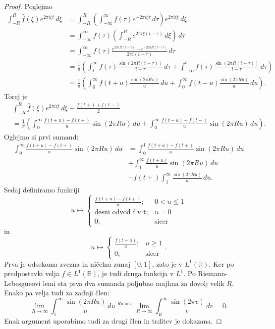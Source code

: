 \documentclass[10pt, a4paper]{article}
\newenvironment{noticeC}{%
  \tcolorbox[%
  notitle,
  empty,
  enhanced,  %
  breakable,
  coltext=black, 
  fontupper=\rmfamily,
  parbox=false,
  noparskip,
  sharp corners,
  boxrule=-1pt,  %
  frame hidden,
  left=7pt,  %
  right=7pt,
  top=5pt,
  bottom=5pt,
  before skip=2.5ex plus 2pt,
  after skip=2.5ex plus 2pt,
  overlay unbroken and last={%
  },
  ]}
{\endtcolorbox}
\newenvironment{dokaz}%
  {\begin{noticeC}\begin{proof}}%
  {\end{proof}\end{noticeC}}
\newcommand{\R}{\mathbb {R}}
\begin{document}
\begin{dokaz}
    Poglejmo 
    \begin{align*}
        \int_{-R} ^R \hat{f} (\xi) e^{2 \pi i \xi t} \, d\xi &= \int_{-R} ^R \left(\int_{-\infty} ^\infty f(\tau) e^{-2 \pi i \xi \tau}\, d\tau\right) e^{2 \pi i \xi t} \, d\xi\\
        &= \int_{-\infty} ^\infty f(\tau) \left(\int_{-R} ^R e^{2 \pi i \xi (t - \tau)}\, d\xi\right)\, d\tau\\
        &= \int_{-\infty} ^\infty f(\tau) \frac{e^{2 \pi i R (t - \tau)} - e^{-2 \pi i R (t - \tau)}}{2 \pi i (t- \tau)} \, d\tau\\
        &= \frac{1}{\pi} \left(\int_{t} ^\infty f(\tau) \frac{\sin (2 \pi R (t - \tau))}{t - \tau}\, d\tau + \int_{-\infty} ^t f(\tau) \frac{\sin (2 \pi R (t - \tau))}{t - \tau}\, d\tau\right) \\
        &= \frac{1}{\pi} \left(\int_0 ^\infty f(t + u) \frac{\sin (2 \pi R u)}{u}\, du + \int_{0} ^\infty f(t-u) \frac{\sin (2 \pi R u)}{u}\, du\right).
    \end{align*}
    Torej je 
    \begin{align*}
        & \int_{-R} ^R \hat{f} (\xi) e^{2 \pi i \xi t}\, d\xi - \frac{f(t+) + f(t-)}{2}\\
        & = \frac{1}{\pi} \left(\int_0 ^\infty \frac{f(t + u) - f(t+)}{u} {\sin (2 \pi R u)}\, du + \int_{0} ^\infty \frac{f(t-u) - f(t-)}{u}\sin (2 \pi R u)\, du\right).
    \end{align*}
    Oglejmo si prvi sumand: 
    \begin{align*}
        \int_0 ^\infty \frac{f(t + u) - f(t+)}{u} {\sin (2 \pi R u)}\, du &= \int_0 ^1 \frac{f(t + u) - f(t+)}{u} {\sin (2 \pi R u)}\, du\\
        &+ \int_1 ^\infty \frac{f(t + u)}{u} {\sin (2 \pi R u)}\, du\\
        &- f(t+)\int_1 ^\infty \frac{{\sin (2 \pi R u)}}{u} \, du.
    \end{align*}
    Sedaj definiramo funkciji 
    $$u \mapsto \begin{cases}
        \frac{f(t + u) - f(t+)}{u} ;& 0 < u \leq 1\\
        \mathrm{\text{desni odvod $f$ v $t$}} ;& u = 0\\
        0; & \mathrm{sicer}
    \end{cases}$$
    in 
    $$u \mapsto \begin{cases}
        \frac{f(t + u)}{u} ; & u \geq 1\\
        0; & \mathrm{sicer}
    \end{cases}.$$
    Prva je odsekoma zvezna in ničelna zunaj $[0, 1]$, zato je v $L^1 (\R)$.
    Ker po predpostavki velja $f \in L^1 (\R)$, je tudi druga funkcija v $L^1$.
    Po Riemann-Lebesgueovi lemi sta prva dva sumanda poljubno majhna za dovolj velik $R$.
    Enako pa velja tudi za zadnji člen:
    $$\lim_{R \to \infty} \int_1 ^\infty \frac{\sin (2 \pi R u)}{u}\, du \stackrel{Ru = v}{=} \lim_{R \to \infty} \int_R ^\infty \frac{\sin (2 \pi v)}{v}\, dv = 0.$$
    Enak argument uporabimo tudi za drugi člen in trditev je dokazana.
\end{dokaz}
\end{document}
